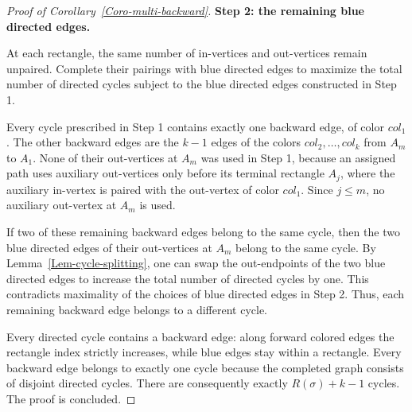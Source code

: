 \documentclass[12pt]{article}
\numberwithin{equation}{section}
\theoremstyle{plain}
\begin{document}
\begin{proof}[Proof of Corollary~\ref{Coro-multi-backward}]
\bigskip
\noindent\textbf{Step 2: the remaining blue directed edges.}

At each rectangle, the same number of in-vertices and out-vertices remain unpaired. Complete their pairings with blue directed edges to maximize the total number of directed cycles subject to the blue directed edges constructed in Step 1.

\bigskip

Every cycle prescribed in Step 1 contains exactly one backward edge, of color $col_1$. The other backward edges are the $k-1$ edges of the colors $col_2,\ldots,col_k$ from $A_m$ to $A_1$. None of their out-vertices at $A_m$ was used in Step 1, because an assigned path uses auxiliary out-vertices only before its terminal rectangle $A_j$, where the auxiliary in-vertex is paired with the out-vertex of color $col_1$. Since $j\le m$, no auxiliary out-vertex at $A_m$ is used.

If two of these remaining backward edges belong to the same cycle, then the two blue directed edges of their out-vertices at $A_m$ belong to the same cycle. By Lemma~\ref{Lem-cycle-splitting}, one can swap the out-endpoints of the two blue directed edges to increase the total number of directed cycles by one. This contradicts maximality of the choices of blue directed edges in Step 2. Thus, each remaining backward edge belongs to a different cycle.

Every directed cycle contains a backward edge: along forward colored edges the rectangle index strictly increases, while blue edges stay within a rectangle. Every backward edge belongs to exactly one cycle because the completed graph consists of disjoint directed cycles. There are consequently exactly $R(\sigma)+k-1$ cycles. The proof is concluded.
\end{proof}
\end{document}
